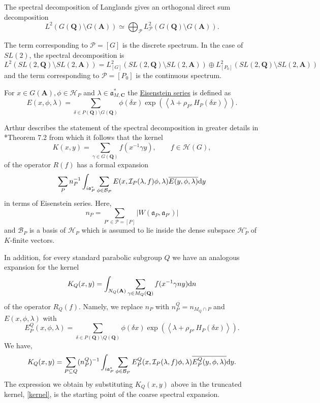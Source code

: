 \documentclass[11pt]{amsart}
\def\A{\mathbf A}
\def\C{\mathbf C}
\def\Q{\mathbf Q}
\def\BBB{\mathcal B}
\def\HHH{\mathcal H}
\def\III{\mathcal I}
\def\PPP{\mathcal P}
\def\aaa{\mathfrak a}
\def\d{\text d}
\def\bs{\setminus}
\def\Ltwo{L^2}
\def\mod#1{\lvert #1 \rvert} %
\def\sprod#1#2{\left\langle #1 , #2 \right\rangle}  %
\theoremstyle{remark}
\begin{document}
The spectral decomposition of Langlands gives an orthogonal direct sum decomposition
\[ \Ltwo(G(\Q)\bs G(\A)) \simeq \bigoplus_{\PPP} \Ltwo_\PPP(G(\Q)\bs G(\A)). \]

The term corresponding to $\PPP = [G]$ is the discrete spectrum. 
In the case of $SL(2)$, the spectral decomposition is 
\[ \Ltwo(SL(2, \Q)\bs SL(2, \A)) = \Ltwo_{[G]} (SL(2, \Q)\bs SL(2, \A)) \oplus \Ltwo_{[P_0]} (SL(2, \Q)\bs SL(2, \A)) \]
and the term corresponding to $\PPP = [P_0]$ is the continuous spectrum.

For $x \in G(\A), \phi \in \HHH_P$ and $\lambda \in \aaa_{M, \C}^*$ the \underline{Eisenstein series} is defined as
\[ E(x, \phi, \lambda) = \sum_{\delta \in P(\Q) \bs G(\Q)} \phi(\delta x) 
		\exp(\sprod{\lambda + \rho_P}{H_P(\delta x)}). \]

Arthur describes the statement of the spectral decomposition in greater details in \cite{clay}*{Theorem 7.2} from which it follows that the kernel 
\[ K(x, y) = \sum_{\gamma \in G(\Q)} f(x^{-1}\gamma y) , \qquad f \in \HHH(G),\]
of the operator $R(f)$ has a formal expansion
\[ \sum_{P} n_P^{-1} \int_{i\aaa_P^*} \sum_{\phi \in \BBB_P} E(x, \III_P(\lambda, f)\phi, \lambda) 
		\overline{E(y, \phi, \lambda)} \d y \]
in terms of Eisenstein series. Here, 
\[ n_P = \sum_{P' \in \PPP = [P]} \mod{W(\aaa_P, \aaa_{P'})} \]
and $\BBB_P$ is a basis of $\HHH_P$ which is assumed to lie inside the dense subspace $\HHH_P^\circ$ of $K$-finite vectors. 

In addition, for every standard parabolic subgroup $Q$ we have an analogous expansion for the kernel 
\[ K_Q(x, y) = \int_{N_Q(\A)} \sum_{\gamma \in M_Q(\Q)} f(x^{-1}\gamma n y) \d n \]
of the operator $R_Q(f)$. Namely, we replace $n_P$ with $n_P^Q = n_{M_Q \cap P}$ and $E(x, \phi, \lambda)$ with \[ E_P^Q(x, \phi, \lambda) = \sum_{\delta \in P(\Q) \bs Q(\Q)} \phi(\delta x) \exp(\sprod{\lambda + \rho_P}{H_P(\delta x)}). \]
We have, 
\[ K_Q(x, y) = \sum_{P \subseteq Q} (n_P^Q)^{-1} \int_{i\aaa_P^*} \sum_{\phi \in \BBB_P}
		E_P^Q(x, \III_P(\lambda, f)\phi, \lambda) \overline{E_P^Q(y, \phi, \lambda)} \d y. \]
The expression we obtain by substituting $K_Q(x, y)$ above in the truncated kernel, \cref{kernel}, is the starting point of the coarse spectral expansion. 
\end{document}
